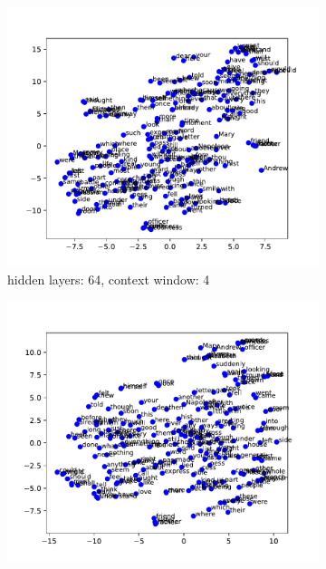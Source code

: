 \documentclass[12pt]{article} \usepackage{COSC420style} \usepackage{soul}
\begin{document}
\begin{figure}[htbp]
	\centering
	\begin{subfigure}[b]{0.45\textwidth}
		\includegraphics[width=\textwidth]{./figures/dim_64_ctx_4_embedding.pdf}
		\caption{hidden layers: 64, context window: 4}
		\label{fig:64_4}
	\end{subfigure}
	\hfill %
	\begin{subfigure}[b]{0.45\textwidth}
		\includegraphics[width=\textwidth]{./figures/dim_128_ctx_4_embedding.pdf}

\end{subfigure}
\end{figure}
\end{document}
